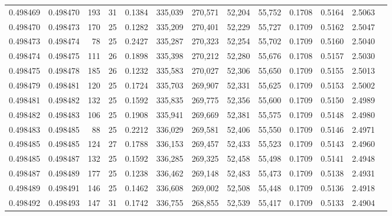 \begin{tabular}{rrrrrrrrrrrrr}
0.498469 & 0.498470 & 193 &  31 &                                     0.1384 & 335,039 & 270,571 &  52,204 &  55,752 & 0.1708 & 0.5164 & 2.5063 \\
0.498470 & 0.498473 & 170 &  25 &                                     0.1282 & 335,209 & 270,401 &  52,229 &  55,727 & 0.1709 & 0.5162 & 2.5047 \\
0.498473 & 0.498474 &  78 &  25 &                                     0.2427 & 335,287 & 270,323 &  52,254 &  55,702 & 0.1709 & 0.5160 & 2.5040 \\
0.498474 & 0.498475 & 111 &  26 &                                     0.1898 & 335,398 & 270,212 &  52,280 &  55,676 & 0.1708 & 0.5157 & 2.5030 \\
0.498475 & 0.498478 & 185 &  26 &                                     0.1232 & 335,583 & 270,027 &  52,306 &  55,650 & 0.1709 & 0.5155 & 2.5013 \\
0.498479 & 0.498481 & 120 &  25 &                                     0.1724 & 335,703 & 269,907 &  52,331 &  55,625 & 0.1709 & 0.5153 & 2.5002 \\
0.498481 & 0.498482 & 132 &  25 &                                     0.1592 & 335,835 & 269,775 &  52,356 &  55,600 & 0.1709 & 0.5150 & 2.4989 \\
0.498482 & 0.498483 & 106 &  25 &                                     0.1908 & 335,941 & 269,669 &  52,381 &  55,575 & 0.1709 & 0.5148 & 2.4980 \\
0.498483 & 0.498485 &  88 &  25 &                                     0.2212 & 336,029 & 269,581 &  52,406 &  55,550 & 0.1709 & 0.5146 & 2.4971 \\
0.498485 & 0.498485 & 124 &  27 &                                     0.1788 & 336,153 & 269,457 &  52,433 &  55,523 & 0.1709 & 0.5143 & 2.4960 \\
0.498485 & 0.498487 & 132 &  25 &                                     0.1592 & 336,285 & 269,325 &  52,458 &  55,498 & 0.1709 & 0.5141 & 2.4948 \\
0.498487 & 0.498489 & 177 &  25 &                                     0.1238 & 336,462 & 269,148 &  52,483 &  55,473 & 0.1709 & 0.5138 & 2.4931 \\
0.498489 & 0.498491 & 146 &  25 &                                     0.1462 & 336,608 & 269,002 &  52,508 &  55,448 & 0.1709 & 0.5136 & 2.4918 \\
0.498492 & 0.498493 & 147 &  31 &                                     0.1742 & 336,755 & 268,855 &  52,539 &  55,417 & 0.1709 & 0.5133 & 2.4904 \\

\end{tabular}
